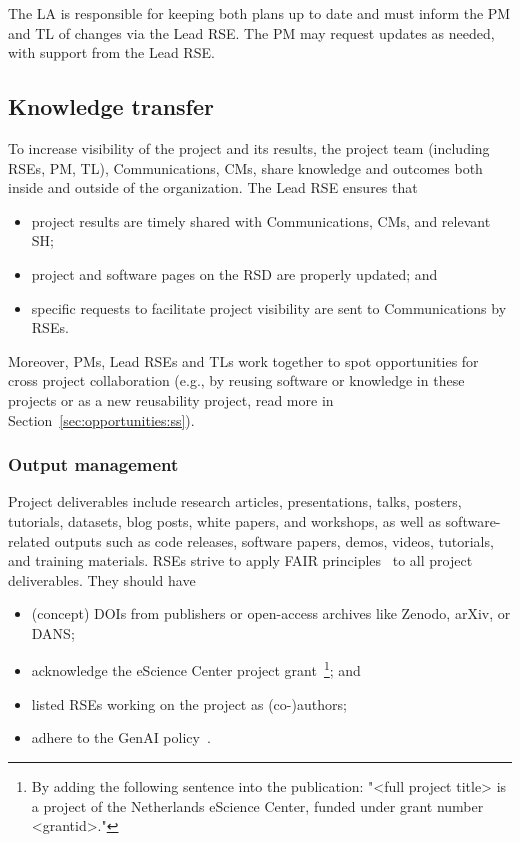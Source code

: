 The LA is responsible for keeping both plans up to date and must inform the PM and TL of changes via the Lead RSE. The PM may request updates as needed, with support from the Lead RSE.


\subsection{Knowledge transfer}

To increase visibility of the project and its results, the project team (including RSEs, PM, TL), Communications, CMs,
share knowledge and outcomes both inside and outside of the organization. The Lead RSE ensures that
\begin{itemize}
\item project results are timely shared with Communications, CMs, and relevant SH;
\item project and software pages on the RSD are properly updated; and
\item specific requests to facilitate project visibility are sent to Communications by RSEs.
\end{itemize}

Moreover, PMs, Lead RSEs and TLs work together to spot opportunities for cross project collaboration (e.g., by reusing
software or knowledge in these projects or as a new reusability project, read more in Section~\ref{sec:opportunities:ss}).



\subsubsection{Output management}
\label{sec:exec:output}
Project deliverables include research articles, presentations, talks, posters, tutorials, datasets, blog posts, white papers, and workshops, 
as well as software-related outputs such as code releases, software papers, demos, videos, tutorials, and training materials. 
%
RSEs strive to apply FAIR principles~\cite{fair-principles,FAIR4RS} to all project deliverables. They should have
\begin{itemize}\itemsep0em
\item (concept) DOIs from publishers or open-access archives like Zenodo, arXiv, or DANS;
\item acknowledge the eScience Center project grant~\footnote{By adding the following sentence into the publication: "<full project title> is a project of the Netherlands eScience Center, funded under grant number <grantid>."}; and
\item listed RSEs working on the project as (co-)authors;
\item adhere to the GenAI policy~\cite{nlesc2023genai}.
\end{itemize}

